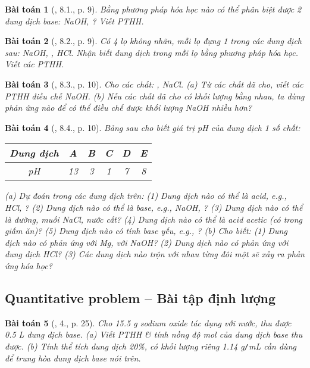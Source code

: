 \documentclass{article}
\newtheorem{baitoan}{Bài toán}
\begin{document}
\begin{baitoan}[\cite{SGK_Hoa_Hoc_9}, 8.1., p. 9]
	Bằng phương pháp hóa học nào có thể phân biệt được 2 dung dịch base: \emph{NaOH, }? Viết PTHH.
\end{baitoan}

\begin{baitoan}[\cite{SGK_Hoa_Hoc_9}, 8.2., p. 9]
	Có 4 lọ không nhãn, mỗi lọ đựng 1 trong các dung dịch sau: \emph{NaOH, , HCl}. Nhận biết dung dịch trong mỗi lọ bằng phương pháp hóa học. Viết các PTHH.
\end{baitoan}

\begin{baitoan}[\cite{SGK_Hoa_Hoc_9}, 8.3., p. 10]
	Cho các chất: \emph{, NaCl}. (a) Từ các chất đã cho, viết các PTHH điều chế \emph{NaOH}. (b) Nếu các chất đã cho có khối lượng bằng nhau, ta dùng phản ứng nào để có thể điều chế được khối lượng \emph{NaOH} nhiều hơn?
\end{baitoan}

\begin{baitoan}[\cite{SGK_Hoa_Hoc_9}, 8.4., p. 10]
	Bảng sau cho biết giá trị pH của dung dịch 1 số chất:
	\begin{table}[H]
		\centering
		\begin{tabular}{|c|c|c|c|c|c|}
			\hline
			Dung dịch & A & B & C & D & E \\
			\hline
			pH & 13 & 3 & 1 & 7 & 8 \\
			\hline
		\end{tabular}
	\end{table}
	\noindent(a) Dự đoán trong các dung dịch trên: (1) Dung dịch nào có thể là acid, e.g., \emph{HCl, }? (2) Dung dịch nào có thể là base, e.g., \emph{NaOH, }? (3) Dung dịch nào có thể là đường, muối \emph{NaCl}, nước cất? (4) Dung dịch nào có thể là acid acetic (có trong giấm ăn)? (5) Dung dịch nào có tính base yếu, e.g., \emph{}? (b) Cho biết: (1) Dung dịch nào có phản ứng với \emph{Mg}, với \emph{NaOH}? (2) Dung dịch nào có phản ứng với dung dịch \emph{HCl}? (3) Các dung dịch nào trộn với nhau từng đôi một sẽ xảy ra phản ứng hóa học?	
\end{baitoan}

\subsection{Quantitative problem -- Bài tập định lượng}

\begin{baitoan}[\cite{SGK_Hoa_Hoc_9}, 4., p. 25]
	Cho \emph{15.5 g} sodium oxide \emph{} tác dụng với nước, thu được \emph{0.5 L} dung dịch base. (a) Viết PTHH \& tính nồng độ mol của dung dịch base thu được. (b) Tính thể tích dung dịch \emph{ 20\%}, có khối lượng riêng \emph{1.14 g\texttt{/}mL} cần dùng để trung hòa dung dịch base nói trên.
\end{baitoan}
\end{document}
